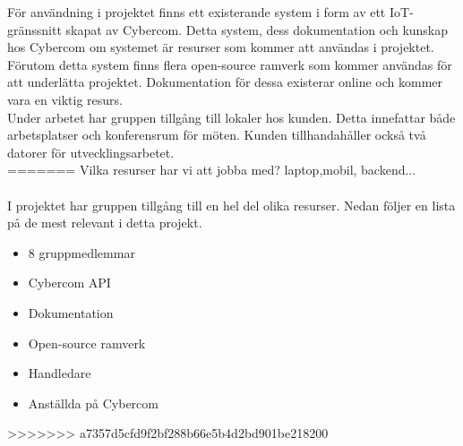 För användning i projektet finns ett existerande system i form av ett IoT-gränssnitt skapat av Cybercom. Detta system, dess dokumentation och kunskap hos Cybercom om systemet är resurser som kommer att användas i projektet. Förutom detta system finns flera open-source ramverk som kommer användas för att underlätta projektet. Dokumentation för dessa existerar online och kommer vara en viktig resurs.\\

Under arbetet har gruppen tillgång till lokaler hos kunden. Detta innefattar både arbetsplatser och konferensrum för möten. Kunden tillhandahåller också två datorer för utvecklingsarbetet. \\
=======
Vilka resurser har vi att jobba med?
laptop,mobil, backend...\\
\\
I projektet har gruppen tillgång till en hel del olika resurser. Nedan följer en lista på de mest relevant i detta projekt.\\
\begin{itemize}
\item 8 gruppmedlemmar
\item Cybercom API
\item Dokumentation
\item Open-source ramverk
\item Handledare
\item Anställda på Cybercom
\end{itemize}
>>>>>>> a7357d5cfd9f2bf288b66e5b4d2bd901be218200
